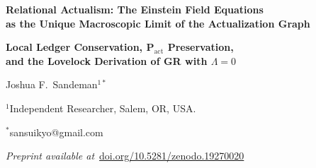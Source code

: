 \documentclass[11pt,a4paper]{article}
\begin{document}
\begin{center}
  {\LARGE\bfseries Relational Actualism: The Einstein Field Equations\\
  as the Unique Macroscopic Limit of the Actualization Graph\par}
  \vspace{6pt}
  {\large\bfseries Local Ledger Conservation, P$_{\mathrm{act}}$ Preservation,\\
  and the Lovelock Derivation of GR with $\Lambda = 0$\par}
  \vspace{14pt}
  {\large Joshua F.\ Sandeman$^{1*}$\par}
  \vspace{4pt}
  {\normalsize $^{1}$Independent Researcher, Salem, OR, USA.\par}
  {\normalsize $^{*}$sansuikyo@gmail.com\par}
  \vspace{8pt}
  {\small\textit{Preprint available at}~\href{https://doi.org/10.5281/zenodo.19270020}{doi.org/10.5281/zenodo.19270020}\par}
  \vspace{14pt}
\end{center}
\end{document}

